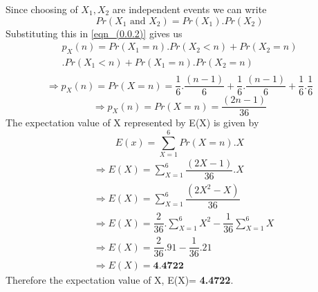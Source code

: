 \documentclass[a4paper]{article}
\begin{document}
\begin{multicols*}{2}
 Since choosing of $X_1,X_2$ are independent events we can write 
 $$Pr(X_1 \text{ and }X_2)=Pr(X_1).Pr(X_2)$$
 Substituting this in \eqref{eqn_(0.0.2)} gives us
\begin{multline}
p_X(n)=Pr(X_1=n).Pr(X_2<n)+Pr(X_2=n)\\
.Pr(X_1<n)+Pr(X_1=n).Pr(X_2=n)\\
\end{multline}
$$\Longrightarrow p_X(n)=Pr(X=n)=\dfrac{1}{6}.\dfrac{(n-1)}{6}+\dfrac{1}{6}.\dfrac{(n-1)}{6}
+\dfrac{1}{6}.\dfrac{1}{6}$$
$$\Longrightarrow p_X(n)=Pr(X=n)=\dfrac{(2n-1)}{36}$$
The expectation value of X represented by E(X) is given by
$$E(x)=\sum_{X=1}^{6} Pr(X=n).X$$
\begin{align}
& \Longrightarrow E(X)=\sum_{X=1}^{6} \dfrac{(2X-1)}{36}.X\\
& \Longrightarrow E(X)=\sum_{X=1}^{6} \dfrac{(2X^2-X)}{36}\\
& \Longrightarrow E(X)=\dfrac{2}{36}.\sum_{X=1}^{6} X^2-\dfrac{1}{36}\sum_{X=1}^{6} X\\
& \Longrightarrow E(X)=\dfrac{2}{36}.91-\dfrac{1}{36}.21\\
& \Longrightarrow E(X)= \textbf{4.4722}
\end{align}
Therefore the expectation value of X, E(X)= \textbf{4.4722}.
\end{multicols*}
\end{document}
